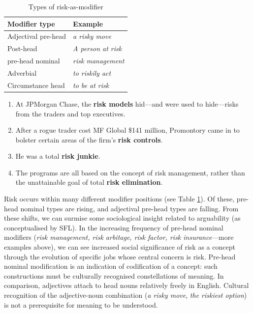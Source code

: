             \begin{table}
            \small
            \centering
            \begin{tabular}{|l|l|}
            \hline
            \textbf{Modifier type}       & \textbf{Example}          \\ \hline
            Adjectival pre-head & \emph{a risky move}     \\ \hline
            Post-head           & \emph{A person at risk} \\ \hline
            pre-head nominal    & \emph{risk management}  \\ \hline
            Adverbial           & \emph{to riskily act}   \\ \hline
            Circumstance head   & \emph{to be at risk }   \\ \hline
            \end{tabular}
            \caption{Types of risk-as-modifier}
            \label{tab:modriskwords}
            \end{table}

            \begin{enumerate}  [before=\itshape,font=\normalfont] \setlength\itemsep{0em} \small
                \item At JPMorgan Chase, the \textbf{risk models} hid---and were used to hide---risks from the traders and top executives.
                \item After a rogue trader cost MF Global \$141 million, Promontory came in to bolster certain areas of the firm's \textbf{risk controls}.
                \item He was a total \textbf{risk junkie}.
                \item The programs are all based on the concept of risk management, rather than the unattainable goal of total \textbf{risk elimination}.
            \end{enumerate}

            Risk occurs within many different modifier positions (see Table \ref{tab:modriskwords}). Of these, pre-head nominal types are rising, and adjectival pre-head types are falling. From these shifts, we can surmise some sociological insight related to arguability (as conceptualised by SFL). In the increasing frequency of pre-head nominal modifiers (\emph{risk management, risk arbitage, risk factor, risk insurance}---more examples above), we can see increased social significance of risk as a concept through the evolution of specific jobs whose central concern is risk. Pre-head nominal modification is an indication of codification of a concept: such constructions must be culturally recognised constellations of meaning. In comparison, adjectives attach to head nouns relatively freely in English. Cultural recognition of the adjective-noun combination (\emph{a risky move}, \emph{the riskiest option}) is not a prerequisite for meaning to be understood.

